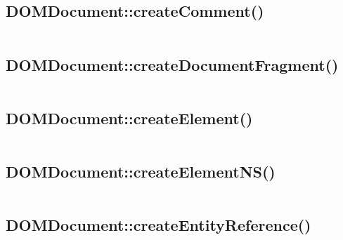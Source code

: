 \begin{lstlisting}[language=PHP]

\end{lstlisting}


\subsection{DOMDocument::createComment()}





\begin{lstlisting}[language=PHP]

\end{lstlisting}


\subsection{DOMDocument::createDocumentFragment()}



\begin{lstlisting}[language=PHP]

\end{lstlisting}

\subsection{DOMDocument::createElement()}



\begin{lstlisting}[language=PHP]

\end{lstlisting}

\subsection{DOMDocument::createElementNS()}



\begin{lstlisting}[language=PHP]

\end{lstlisting}

\subsection{DOMDocument::createEntityReference()}


\begin{lstlisting}[language=PHP]

\end{lstlisting}


